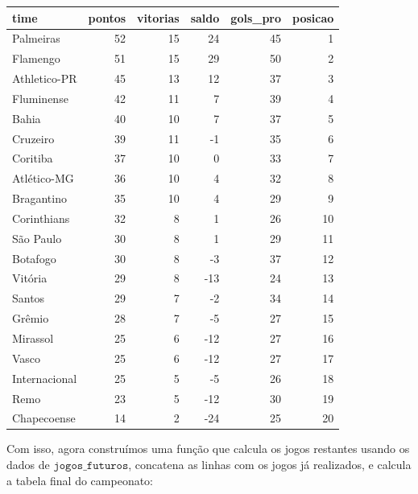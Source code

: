 \documentclass[11pt,]{article}
\begin{document}
\begin{longtable}[]{@{}lrrrrr@{}}
\toprule\noalign{}
time & pontos & vitorias & saldo & gols\_pro & posicao \\
\midrule\noalign{}
\endhead
\bottomrule\noalign{}
\endlastfoot
Palmeiras & 52 & 15 & 24 & 45 & 1 \\
Flamengo & 51 & 15 & 29 & 50 & 2 \\
Athletico-PR & 45 & 13 & 12 & 37 & 3 \\
Fluminense & 42 & 11 & 7 & 39 & 4 \\
Bahia & 40 & 10 & 7 & 37 & 5 \\
Cruzeiro & 39 & 11 & -1 & 35 & 6 \\
Coritiba & 37 & 10 & 0 & 33 & 7 \\
Atlético-MG & 36 & 10 & 4 & 32 & 8 \\
Bragantino & 35 & 10 & 4 & 29 & 9 \\
Corinthians & 32 & 8 & 1 & 26 & 10 \\
São Paulo & 30 & 8 & 1 & 29 & 11 \\
Botafogo & 30 & 8 & -3 & 37 & 12 \\
Vitória & 29 & 8 & -13 & 24 & 13 \\
Santos & 29 & 7 & -2 & 34 & 14 \\
Grêmio & 28 & 7 & -5 & 27 & 15 \\
Mirassol & 25 & 6 & -12 & 27 & 16 \\
Vasco & 25 & 6 & -12 & 27 & 17 \\
Internacional & 25 & 5 & -5 & 26 & 18 \\
Remo & 23 & 5 & -12 & 30 & 19 \\
Chapecoense & 14 & 2 & -24 & 25 & 20 \\
\end{longtable}

Com isso, agora construímos uma função que calcula os jogos restantes
usando os dados de \(\texttt{jogos\_futuros}\), concatena as linhas com
os jogos já realizados, e calcula a tabela final do campeonato:
\end{document}
